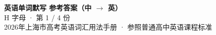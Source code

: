 \documentclass[10pt,a4paper]{article}
\begin{document}
\pagestyle{plain}

\begin{center}
{\LARGE\bfseries 英语单词默写 \quad 参考答案（中 $\to$ 英）}\\[0.22em]
{\large H 字母 · 第 1 / 4 份}\\[0.18em]
{\small 2026年上海市高考英语词汇用法手册 · 参照普通高中英语课程标准}
\end{center}

\vspace{0.2em}
\noindent{\color{rulegray}\rule{\textwidth}{0.8pt}}

\vspace{0.35em}

\vspace{0.25em}
\renewcommand{\arraystretch}{1.32}
\end{document}
